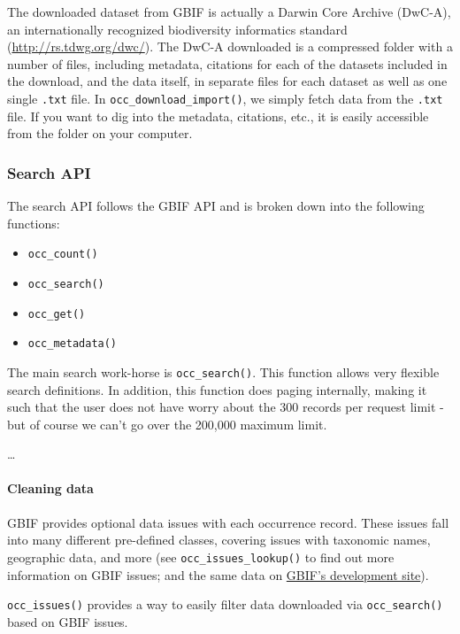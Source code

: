 \documentclass[author-year, review, 11pt]{components/elsarticle} %
\begin{document}
The downloaded dataset from GBIF is actually a Darwin Core Archive
(DwC-A), an internationally recognized biodiversity informatics standard
(\url{http://rs.tdwg.org/dwc/}). The DwC-A downloaded is a compressed
folder with a number of files, including metadata, citations for each of
the datasets included in the download, and the data itself, in separate
files for each dataset as well as one single \texttt{.txt} file. In
\texttt{occ\_download\_import()}, we simply fetch data from the
\texttt{.txt} file. If you want to dig into the metadata, citations,
etc., it is easily accessible from the folder on your computer.

\subsubsection{Search API}\label{search-api}

The search API follows the GBIF API and is broken down into the
following functions:

\begin{itemize}
\itemsep1pt\parskip0pt
\item
  \texttt{occ\_count()}
\item
  \texttt{occ\_search()}
\item
  \texttt{occ\_get()}
\item
  \texttt{occ\_metadata()}
\end{itemize}

The main search work-horse is \texttt{occ\_search()}. This function
allows very flexible search definitions. In addition, this function does
paging internally, making it such that the user does not have worry
about the 300 records per request limit - but of course we can't go over
the 200,000 maximum limit.

\ldots{}

\paragraph{Cleaning data}\label{cleaning-data}

GBIF provides optional data issues with each occurrence record. These
issues fall into many different pre-defined classes, covering issues
with taxonomic names, geographic data, and more (see
\texttt{occ\_issues\_lookup()} to find out more information on GBIF
issues; and the same data on
\href{http://gbif.github.io/gbif-api/apidocs/org/gbif/api/vocabulary/OccurrenceIssue.html}{GBIF's
development site}).

\texttt{occ\_issues()} provides a way to easily filter data downloaded
via \texttt{occ\_search()} based on GBIF issues.
\end{document}
